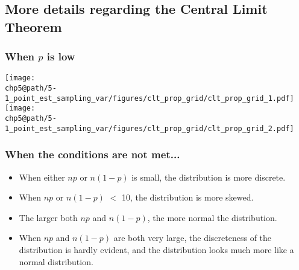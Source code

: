 
\subsection{More details regarding the Central Limit Theorem}


\begin{frame}
\frametitle{When $p$ is low}


\pause


\end{frame}


\begin{frame}


\begin{center}
\texttt{[image: \\chp5@path/5-1\_point\_est\_sampling\_var/figures/clt\_prop\_grid/clt\_prop\_grid\_1.pdf]}
\texttt{[image: \\chp5@path/5-1\_point\_est\_sampling\_var/figures/clt\_prop\_grid/clt\_prop\_grid\_2.pdf]}
\end{center}

\end{frame}


\begin{frame}
\frametitle{When the conditions are not met...}

\begin{itemize}

\item When either $np$ or $n(1-p)$ is small, the distribution is more discrete.
\item When $np$ or $n(1-p)$ $<$ 10, the distribution is more skewed.
\item The larger both $np$ and $n(1-p)$, the more normal the distribution.
\item When $np$ and $n(1-p)$ are both very large, the discreteness of the distribution is hardly evident, and the distribution looks much more like a normal distribution.

\end{itemize}

\end{frame}

